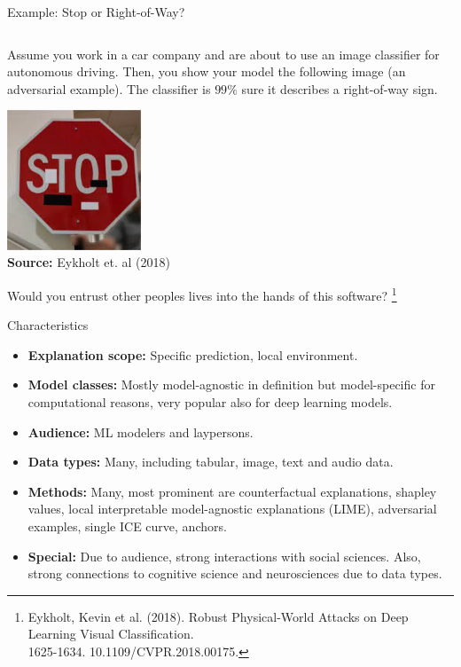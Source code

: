 \documentclass[11pt,compress,t,notes=noshow, aspectratio=169, xcolor=table]{beamer}
\begin{document}
\begin{vbframe}{Example: Stop or Right-of-Way?}

\begin{columns}

\end{columns}

Assume you work in a car company and are about to use an image classifier for autonomous driving. Then, you show your model the following image (an adversarial example). The classifier is $99\%$ sure it describes a right-of-way sign.



	\begin{center}
		\includegraphics[width=0.3\textwidth]{figure/IntroStop.jpg}\\
		{\tiny \textbf{Source:} Eykholt et. al (2018)}
	\end{center}
	Would you entrust other peoples lives into the hands of this software?
	\footnote[frame]{Eykholt, Kevin et al. (2018). Robust Physical-World Attacks on Deep Learning Visual Classification. \\1625-1634. 10.1109/CVPR.2018.00175.}
\end{vbframe}

\begin{vbframe}{Characteristics}
	\begin{itemize}
		\item \textbf{Explanation scope:} Specific prediction, local environment.
		\item \textbf{Model classes:} Mostly model-agnostic in definition but model-specific for computational reasons, very popular also for deep learning models.
		\item \textbf{Audience:} ML modelers and laypersons.
		\item \textbf{Data types:} Many, including tabular, image, text and audio data.
		\item \textbf{Methods:} Many, most prominent are counterfactual explanations, shapley values, local interpretable model-agnostic explanations (LIME), adversarial examples, single ICE curve, anchors.
		\item \textbf{Special:} Due to audience, strong interactions with social sciences. Also, strong connections to cognitive science and neurosciences due to data types.
	\end{itemize}
\end{vbframe}
\end{document}
